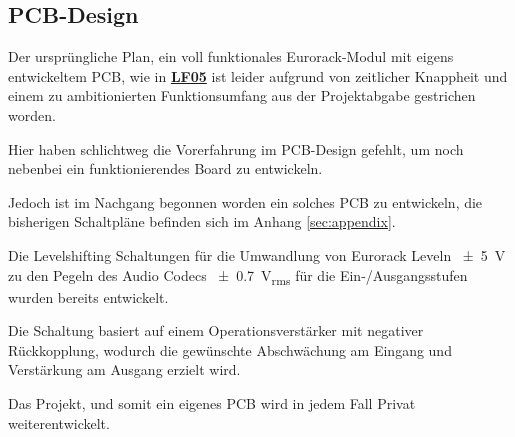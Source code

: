 \subsection{PCB-Design}\label{sec:pcb-design}

Der ursprüngliche Plan, ein voll funktionales Eurorack-Modul mit eigens entwickeltem PCB, wie in \textbf{\hyperlink{lf-pcbdesign}{LF05}} ist leider aufgrund von zeitlicher Knappheit und einem zu ambitionierten Funktionsumfang aus der Projektabgabe gestrichen worden.

Hier haben schlichtweg die Vorerfahrung im PCB-Design gefehlt, um noch nebenbei ein funktionierendes Board zu entwickeln.

Jedoch ist im Nachgang begonnen worden ein solches PCB zu entwickeln, die bisherigen Schaltpläne befinden sich im Anhang \ref{sec:appendix}.

Die Levelshifting Schaltungen für die Umwandlung von Eurorack Leveln \SI{\pm 5}{\volt} zu den Pegeln des Audio Codecs \SI{\pm 0.7}{\volt_{rms}} für die Ein-/Ausgangsstufen wurden bereits entwickelt.

Die Schaltung basiert auf einem Operationsverstärker mit negativer Rückkopplung, wodurch die gewünschte Abschwächung am Eingang und Verstärkung am Ausgang erzielt wird.

Das Projekt, und somit ein eigenes PCB wird in jedem Fall Privat weiterentwickelt.
